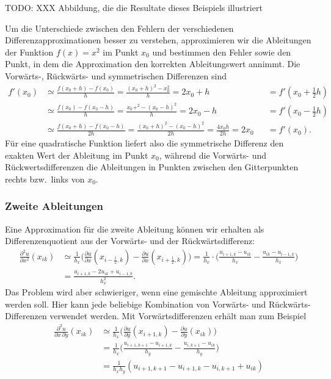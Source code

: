 \begin{beispiel}
TODO: XXX Abbildung, die die Resultate dieses Beispiels illustriert

Um die Unterschiede zwischen den Fehlern der verschiedenen
Differenzapproximationen besser zu verstehen, approximieren wir die
Ableitungen der Funktion $f(x)=x^2$ im Punkt $x_0$ und bestimmen den
Fehler sowie den Punkt, in dem die Approximation den korrekten Ableitungswert
annimmt.
Die Vorwärts-, Rückwärts- und symmetrischen Differenzen sind
\begin{align*}
f'(x_0)
&\simeq
\frac{f(x_0+h)-f(x_0)}{h}
=
\frac{(x_0+h)^2-x_0^2}{h}
=
2x_0+h
&&=
f'(x_0 + {\textstyle\frac12}h)
\\
&\simeq
\frac{f(x_0)-f(x_0-h)}{h}
=
\frac{x_0+^2-(x_0-h)^2}{h}
=
2x_0-h
&&=
f'(x_0 - {\textstyle\frac12}h)
\\
&\simeq
\frac{f(x_0+h)-f(x_0-h)}{2h}
=
\frac{(x_0+h)^2-(x_0-h)^2}{2h}
=
\frac{4x_0h}{2h}=2x_0
&&=
f'(x_0).
\end{align*}
Für eine quadratische Funktion liefert also die symmetrische Differenz
den exakten Wert der Ableitung im Punkt $x_0$, während die Vorwärts-
und Rückwertsdifferenzen die Ableitungen in Punkten zwischen
den Gitterpunkten rechts bzw.~links von $x_0$.
\end{beispiel}

\subsubsection{Zweite Ableitungen}
Eine Approximation für die zweite Ableitung können wir erhalten als
Differenzenquotient aus der Vorwärts- und der Rückwärtsdifferenz:
\begin{align*}
\frac{\partial^2 u}{\partial x^2}(x_{ik})
&\simeq
\frac{1}{h_x}\biggl(
\frac{\partial u}{\partial x}(x_{i-\frac12,k})
-
\frac{\partial u}{\partial x}(x_{i+\frac12,k})
\biggr)
=
\frac{1}{h_x}
\cdot
\biggl(
\frac{u_{i+1,k}-u_{ik}}{h_x}
-
\frac{u_{ik}-u_{i-1,k}}{h_x}
\biggr)
\\
&=
\frac{u_{i+1,k}-2u_{ik}+u_{i-1,k}}{h_x^2}.
\end{align*}
Das Problem wird aber schwieriger, wenn eine gemischte Ableitung
approximiert werden soll.
Hier kann jede beliebige Kombination von Vorwärts- und Rückwärts-Differenzen
verwendet werden.
Mit Vorwärtsdifferenzen erhält man zum Beispiel
\begin{align*}
\frac{\partial^2u}{\partial x\,\partial y}(x_{ik})
&\simeq
\frac{1}{h_x}\biggl(
\frac{\partial u}{\partial y}(x_{i+1,k})
-
\frac{\partial u}{\partial y}(x_{ik})
\biggr)
\\
&=
\frac{1}{h_x}\biggl(
\frac{u_{i+1,k+1}-u_{i+1,k}}{h_y}
-
\frac{u_{i,k+1}-u_{ik}}{h_y}
\biggr)
\\
&=
\frac{1}{h_xh_y}(
u_{i+1,k+1}-u_{i+1,k}
-
u_{i,k+1}+u_{ik}
)
\end{align*}


